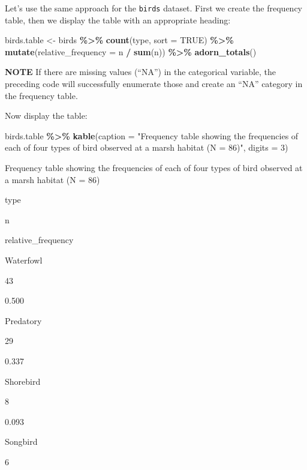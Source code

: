 \documentclass[
]{book}
\newenvironment{Shaded}{\begin{snugshade}}{\end{snugshade}}
\newcommand{\AttributeTok}[1]{\textcolor[rgb]{0.13,0.29,0.53}{#1}}
\newcommand{\ConstantTok}[1]{\textcolor[rgb]{0.56,0.35,0.01}{#1}}
\newcommand{\DecValTok}[1]{\textcolor[rgb]{0.00,0.00,0.81}{#1}}
\newcommand{\FunctionTok}[1]{\textcolor[rgb]{0.13,0.29,0.53}{\textbf{#1}}}
\newcommand{\NormalTok}[1]{#1}
\newcommand{\OtherTok}[1]{\textcolor[rgb]{0.56,0.35,0.01}{#1}}
\newcommand{\SpecialCharTok}[1]{\textcolor[rgb]{0.81,0.36,0.00}{\textbf{#1}}}
\newcommand{\StringTok}[1]{\textcolor[rgb]{0.31,0.60,0.02}{#1}}
\begin{document}
Let's use the same approach for the \texttt{birds} dataset. First we create the frequency table, then we display the table with an appropriate heading:

\begin{Shaded}
\begin{Highlighting}[]
\NormalTok{birds.table }\OtherTok{\textless{}{-}}\NormalTok{ birds }\SpecialCharTok{\%\textgreater{}\%}
  \FunctionTok{count}\NormalTok{(type, }\AttributeTok{sort =} \ConstantTok{TRUE}\NormalTok{) }\SpecialCharTok{\%\textgreater{}\%} 
  \FunctionTok{mutate}\NormalTok{(}\AttributeTok{relative\_frequency =}\NormalTok{ n }\SpecialCharTok{/} \FunctionTok{sum}\NormalTok{(n)) }\SpecialCharTok{\%\textgreater{}\%} 
  \FunctionTok{adorn\_totals}\NormalTok{()}
\end{Highlighting}
\end{Shaded}

\textbf{NOTE}
If there are missing values (``NA'') in the categorical variable, the preceding code will successfully enumerate those and create an ``NA'' category in the frequency table.

Now display the table:

\begin{Shaded}
\begin{Highlighting}[]
\NormalTok{birds.table }\SpecialCharTok{\%\textgreater{}\%}
  \FunctionTok{kable}\NormalTok{(}\AttributeTok{caption =} \StringTok{"Frequency table showing the frequencies of each of four types of bird observed at a marsh habitat (N = 86)"}\NormalTok{, }\AttributeTok{digits =} \DecValTok{3}\NormalTok{)}
\end{Highlighting}
\end{Shaded}

\label{tab:birdfreqtable}Frequency table showing the frequencies of each of four types of bird observed at a marsh habitat (N = 86)

type

n

relative\_frequency

Waterfowl

43

0.500

Predatory

29

0.337

Shorebird

8

0.093

Songbird

6
\end{document}
